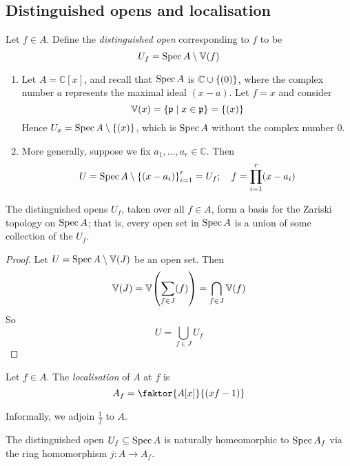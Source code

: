 \subsection{Distinguished opens and localisation}
\begin{definition}
    Let \( f \in A \).
    Define the \emph{distinguished open} corresponding to \( f \) to be
    \[ U_f = \operatorname{Spec} A \setminus \mathbb V(f) \]
\end{definition}
\begin{example}
    \begin{enumerate}
        \item Let \( A = \mathbb C[x] \), and recall that \( \operatorname{Spec} A \) is \( \mathbb C \cup \qty{(0)} \), where the complex number \( a \) represents the maximal ideal \( (x - a) \).
        Let \( f = x \) and consider
        \[ \mathbb V(x) = \qty{\mathfrak p \mid x \in \mathfrak p} = \qty{(x)} \]
        Hence \( U_x = \operatorname{Spec} A \setminus \qty{(x)} \), which is \( \operatorname{Spec} A \) without the complex number 0.
        \item More generally, suppose we fix \( a_1, \dots, a_r \in \mathbb C \).
        Then
        \[ U = \operatorname{Spec} A \setminus \qty{(x - a_i)}_{i=1}^r = U_f;\quad f = \prod_{i=1}^r (x-a_i) \]
    \end{enumerate}
\end{example}
\begin{lemma}
    The distinguished opens \( U_f \), taken over all \( f \in A \), form a basis for the Zariski topology on \( \operatorname{Spec} A \); that is, every open set in \( \operatorname{Spec} A \) is a union of some collection of the \( U_f \).
\end{lemma}
\begin{proof}
    Let \( U = \operatorname{Spec} A \setminus \mathbb V(J) \) be an open set.
    Then
    \[ \mathbb V(J) = \mathbb V\qty(\sum_{f \in J} (f)) = \bigcap_{f \in J} \mathbb V(f) \]
    So
    \[ U = \bigcup_{f \in J} U_f \]
\end{proof}
\begin{definition}
    Let \( f \in A \).
    The \emph{localisation} of \( A \) at \( f \) is
    \[ A_f = \faktor{A[x]}{(xf - 1)} \]
\end{definition}
Informally, we adjoin \( \frac{1}{f} \) to \( A \).
\begin{lemma}
    The distinguished open \( U_f \subseteq \operatorname{Spec} A \) is naturally homeomorphic to \( \operatorname{Spec} A_f \) via the ring homomorphism \( j : A \to A_f \).
\end{lemma}

